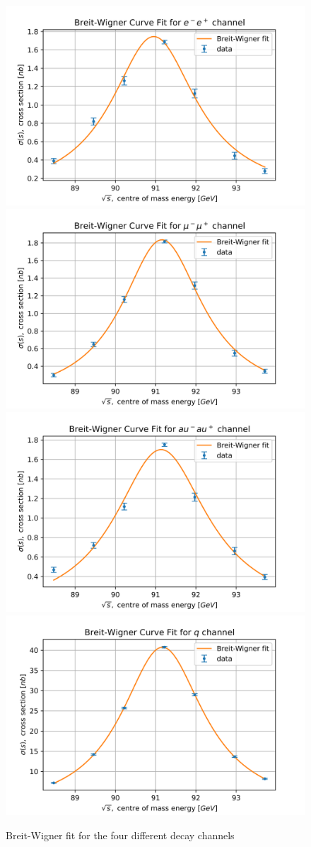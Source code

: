 \begin{figure}[h!]
\begin{center}
    \includegraphics[width = 6 cm]{e213-ee-fit.png}
    \includegraphics[width = 6 cm]{e213-mm-fit.png}
    \includegraphics[width = 6 cm]{e213-tt-fit.png}
    \includegraphics[width = 6 cm]{e213-qq-fit.png}
\end{center}
\caption{Breit-Wigner fit for the four different decay channels}
\label{fig:bwfit}
\end{figure}
